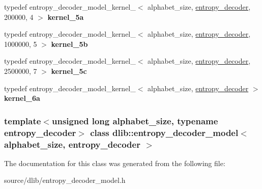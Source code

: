 \begin{DoxyCompactItemize}
\item 
\hypertarget{classdlib_1_1entropy__decoder__model_a9ec3613cee5a64993dbf44e9d32bbbdc}{
typedef entropy\_\-decoder\_\-model\_\-kernel\_$<$ alphabet\_\-size, \hyperlink{classdlib_1_1entropy__decoder}{entropy\_\-decoder}, 200000, 4 $>$ {\bfseries kernel\_\-5a}}
\label{classdlib_1_1entropy__decoder__model_a9ec3613cee5a64993dbf44e9d32bbbdc}

\item 
\hypertarget{classdlib_1_1entropy__decoder__model_a85aedf944576b934da4652be16486bcc}{
typedef entropy\_\-decoder\_\-model\_\-kernel\_$<$ alphabet\_\-size, \hyperlink{classdlib_1_1entropy__decoder}{entropy\_\-decoder}, 1000000, 5 $>$ {\bfseries kernel\_\-5b}}
\label{classdlib_1_1entropy__decoder__model_a85aedf944576b934da4652be16486bcc}

\item 
\hypertarget{classdlib_1_1entropy__decoder__model_a1a0a7e4b6eebe178222f8846af5d3b2b}{
typedef entropy\_\-decoder\_\-model\_\-kernel\_$<$ alphabet\_\-size, \hyperlink{classdlib_1_1entropy__decoder}{entropy\_\-decoder}, 2500000, 7 $>$ {\bfseries kernel\_\-5c}}
\label{classdlib_1_1entropy__decoder__model_a1a0a7e4b6eebe178222f8846af5d3b2b}

\item 
\hypertarget{classdlib_1_1entropy__decoder__model_a898904b2221a1bde850ae3429390c279}{
typedef entropy\_\-decoder\_\-model\_\-kernel\_$<$ alphabet\_\-size, \hyperlink{classdlib_1_1entropy__decoder}{entropy\_\-decoder} $>$ {\bfseries kernel\_\-6a}}
\label{classdlib_1_1entropy__decoder__model_a898904b2221a1bde850ae3429390c279}

\end{DoxyCompactItemize}
\subsubsection*{template$<$unsigned long alphabet\_\-size, typename entropy\_\-decoder$>$ class dlib::entropy\_\-decoder\_\-model$<$ alphabet\_\-size, entropy\_\-decoder $>$}



The documentation for this class was generated from the following file:\begin{DoxyCompactItemize}
\item 
source/dlib/entropy\_\-decoder\_\-model.h\end{DoxyCompactItemize}
